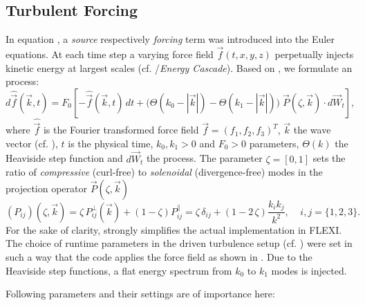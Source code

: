 \subsection{Turbulent Forcing}
\label{sec:turbuforcing}



In equation , a \emph{source} respectively
\emph{forcing} term was introduced into the Euler equations. At each time step
a varying force field $\vec{f}(t,x,y,z)$ perpetually injects kinetic energy at
largest scales (cf. /\emph{Energy Cascade}). Based on
\cite{schmidt2009numerical}, we formulate an  process:
\begin{equation}
\label{eqn:ornstein-uhlenbeck}
  d\widehat{\vec{f}}(\vec{k},t) = F_0
        \left[-\hat{\vec{f}}(\vec{k},t)\,dt 
        + \big(\Theta(k_0 - |\vec{k}|) - \Theta(k_1 - |\vec{k}|)\big)\; \vec{P}(\zeta,\vec{k})\cdot d\vec{W}_t \right],
\end{equation}
where $\widehat{\vec{f}}$ is the Fourier transformed force field $\vec{f} =
(f_1,f_2,f_3)^T$, $\vec{k}$ the wave vector (cf.  ),
$t$ is the physical time, $k_0,k_1 > 0$ and $F_0 > 0$ parameters, $\Theta(k)$ the
Heaviside step function and $d\vec{W}_t$ the  process. The
parameter $\zeta = [0,1]$ sets the ratio of \emph{compressive} (curl-free) to
\emph{solenoidal} (divergence-free) modes in the projection operator
$\vec{P}(\zeta,\vec{k})$
\begin{equation}
  (P_{ij})(\zeta,\vec{k}) = \zeta\,P_{ij}^\perp(\vec{k}) + (1-\zeta) P_{ij}^\parallel =\zeta\,\delta_{ij} + (1-2\,\zeta) \frac{k_i k_j}{k^2},\;\;\;\; i,j = \{1,2,3\}.
\end{equation}
For the sake of clarity,  strongly simplifies the
actual implementation in FLEXI. The choice of runtime parameters in the driven
turbulence setup (cf. ) were set in such a way that the code
applies the force field as shown in .  Due to the
Heaviside step functions, a flat energy spectrum from $k_0$ to $k_1$ modes is
injected. 

Following parameters and their settings are of importance here:

